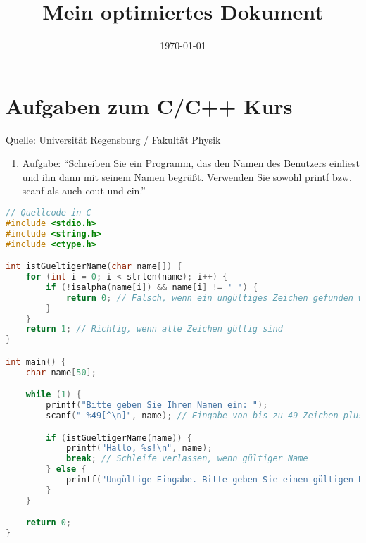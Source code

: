 \documentclass[12pt,a4paper]{scrartcl}
\title{Mein optimiertes Dokument}
\date{\today}
\newcommand{\tightlist}{
  \setlength{\itemsep}{0pt}\setlength{\parskip}{0pt}
}
\begin{document}
\maketitle

\hypertarget{aufgaben-zum-cc-kurs}{%
\section{Aufgaben zum C/C++ Kurs}\label{aufgaben-zum-cc-kurs}}

Quelle: Universität Regensburg / Fakultät Physik

\begin{enumerate}
\def\labelenumi{\arabic{enumi}.}
\tightlist
\item
  Aufgabe: ``Schreiben Sie ein Programm, das den Namen des Benutzers
  einliest und ihn dann mit seinem Namen begrüßt. Verwenden Sie sowohl
  printf bzw. scanf als auch cout und cin.''
\end{enumerate}

\begin{lstlisting}[language=C]
// Quellcode in C
#include <stdio.h>
#include <string.h>
#include <ctype.h>

int istGueltigerName(char name[]) {
    for (int i = 0; i < strlen(name); i++) {
        if (!isalpha(name[i]) && name[i] != ' ') {
            return 0; // Falsch, wenn ein ungültiges Zeichen gefunden wird
        }
    }
    return 1; // Richtig, wenn alle Zeichen gültig sind
}

int main() {
    char name[50];

    while (1) {
        printf("Bitte geben Sie Ihren Namen ein: ");
        scanf(" %49[^\n]", name); // Eingabe von bis zu 49 Zeichen plus Null-Terminator

        if (istGueltigerName(name)) {
            printf("Hallo, %s!\n", name);
            break; // Schleife verlassen, wenn gültiger Name
        } else {
            printf("Ungültige Eingabe. Bitte geben Sie einen gültigen Namen ein.\n");
        }
    }

    return 0;
}
\end{lstlisting}
\end{document}
